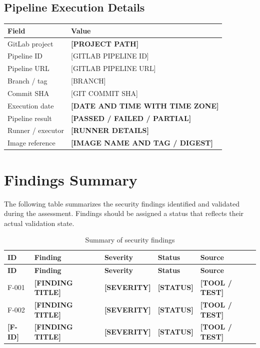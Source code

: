 \documentclass[11pt,a4paper]{report}
\newcommand{\CommitSHA}{[GIT COMMIT SHA]}
\newcommand{\PipelineID}{[GITLAB PIPELINE ID]}
\newcommand{\PipelineURL}{[GITLAB PIPELINE URL]}
\newcommand{\BranchName}{[BRANCH]}
\newcommand{\placeholder}[1]{\textbf{[#1]}}
\begin{document}
\section{Pipeline Execution Details}
\begin{tabularx}{\textwidth}{@{}p{43mm}Y@{}}
    \toprule
    \textbf{Field} & \textbf{Value} \\
    \midrule
    GitLab project & \placeholder{PROJECT PATH} \\
    Pipeline ID & \PipelineID \\
    Pipeline URL & \PipelineURL \\
    Branch / tag & \BranchName \\
    Commit SHA & \CommitSHA \\
    Execution date & \placeholder{DATE AND TIME WITH TIME ZONE} \\
    Pipeline result & \placeholder{PASSED / FAILED / PARTIAL} \\
    Runner / executor & \placeholder{RUNNER DETAILS} \\
    Image reference & \placeholder{IMAGE NAME AND TAG / DIGEST} \\
    \bottomrule
\end{tabularx}

\chapter{Findings Summary}

The following table summarizes the security findings identified and validated
during the assessment. Findings should be assigned a status that reflects their
actual validation state.

\begin{longtable}{@{}p{16mm}p{65mm}p{25mm}p{27mm}p{25mm}@{}}
    \caption{Summary of security findings}\\
    \toprule
    \textbf{ID} & \textbf{Finding} & \textbf{Severity} &
    \textbf{Status} & \textbf{Source} \\
    \midrule
    \endfirsthead
    \toprule
    \textbf{ID} & \textbf{Finding} & \textbf{Severity} &
    \textbf{Status} & \textbf{Source} \\
    \midrule
    \endhead
    F-001 & \placeholder{FINDING TITLE} & \placeholder{SEVERITY} &
    \placeholder{STATUS} & \placeholder{TOOL / TEST} \\
    F-002 & \placeholder{FINDING TITLE} & \placeholder{SEVERITY} &
    \placeholder{STATUS} & \placeholder{TOOL / TEST} \\
    \placeholder{F-ID} & \placeholder{FINDING TITLE} &
    \placeholder{SEVERITY} & \placeholder{STATUS} &
    \placeholder{TOOL / TEST} \\
    \bottomrule
\end{longtable}
\end{document}
